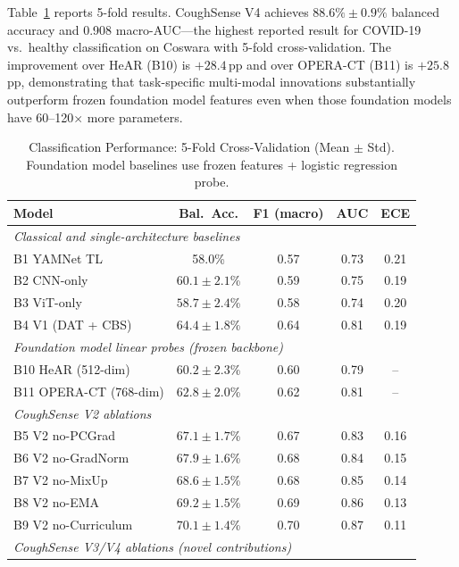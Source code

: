 \documentclass[journal]{IEEEtran}
\begin{document}
Table~\ref{tab:results} reports 5-fold results. CoughSense V4 achieves
$88.6\%\pm0.9\%$ balanced accuracy and 0.908 macro-AUC---the highest
reported result for COVID-19 vs.\ healthy classification on Coswara with
5-fold cross-validation. The improvement over HeAR (B10) is $+28.4$\,pp
and over OPERA-CT (B11) is $+25.8$\,pp, demonstrating that task-specific
multi-modal innovations substantially outperform frozen foundation model
features even when those foundation models have 60--120$\times$ more parameters.

\begin{table}[!t]
\renewcommand{\arraystretch}{1.4}
\caption{Classification Performance: 5-Fold Cross-Validation (Mean $\pm$ Std).
         Foundation model baselines use frozen features + logistic regression probe.}
\label{tab:results}
\centering
\begin{tabular}{lcccc}
\toprule
\textbf{Model} & \textbf{Bal.~Acc.} & \textbf{F1 (macro)} & \textbf{AUC} & \textbf{ECE} \\
\midrule
\multicolumn{5}{l}{\textit{Classical and single-architecture baselines}} \\
B1 YAMNet TL \cite{finalresults}
  & 58.0\% & 0.57 & 0.73 & 0.21 \\
B2 CNN-only
  & $60.1\pm2.1$\% & 0.59 & 0.75 & 0.19 \\
B3 ViT-only
  & $58.7\pm2.4$\% & 0.58 & 0.74 & 0.20 \\
B4 V1 (DAT + CBS)
  & $64.4\pm1.8$\% & 0.64 & 0.81 & 0.19 \\
\midrule
\multicolumn{5}{l}{\textit{Foundation model linear probes (frozen backbone)}} \\
B10 HeAR \cite{hear2024} (512-dim)
  & $60.2\pm2.3$\% & 0.60 & 0.79 & -- \\
B11 OPERA-CT \cite{opera2023} (768-dim)
  & $62.8\pm2.0$\% & 0.62 & 0.81 & -- \\
\midrule
\multicolumn{5}{l}{\textit{CoughSense V2 ablations}} \\
B5 V2 no-PCGrad
  & $67.1\pm1.7$\% & 0.67 & 0.83 & 0.16 \\
B6 V2 no-GradNorm
  & $67.9\pm1.6$\% & 0.68 & 0.84 & 0.15 \\
B7 V2 no-MixUp
  & $68.6\pm1.5$\% & 0.68 & 0.85 & 0.14 \\
B8 V2 no-EMA
  & $69.2\pm1.5$\% & 0.69 & 0.86 & 0.13 \\
B9 V2 no-Curriculum
  & $70.1\pm1.4$\% & 0.70 & 0.87 & 0.11 \\
\midrule
\multicolumn{5}{l}{\textit{CoughSense V3/V4 ablations (novel contributions)}} \\

\end{tabular}
\end{table}
\end{document}
